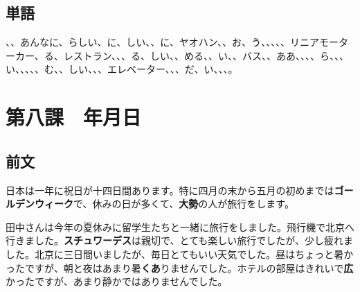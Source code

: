 \documentclass[a5j]{ltjtarticle}
\begin{document}
\subsection*{単語}

\begin{onehalfspace}
  、、あんなに、らしい、に、しい、、に、ヤオハン、、お、う、、、、、リニアモーターカー、る、レストラン、、、る、しい、、める、、い、、バス、、ああ、、、、ら、、、い、、、、、む、、しい、、、エレベーター、、、だ、い、、、。
\end{onehalfspace}

\section*{第八課　年月日}

\subsection*{前文}

日本は一年に祝日が十四日間あります。特に四月の末から五月の初めまでは\textbf{ゴールデンウィーク}で、休みの日が多くて、\textbf{大勢}の人が旅行をします。

田中さんは今年の夏休みに留学生たちと一緒に旅行をしました。飛行機で北京へ行きました。\textbf{スチュワーデス}は親切で、とても楽しい旅行でしたが、少し疲れました。北京に三日間いましたが、毎日とてもいい天気でした。昼はちょっと暑かったですが、朝と夜はあまり暑\textbf{くあ}りませんでした。ホテルの部屋はきれいで\textbf{広}かったですが、あまり静かではありませんでした。
\end{document}
